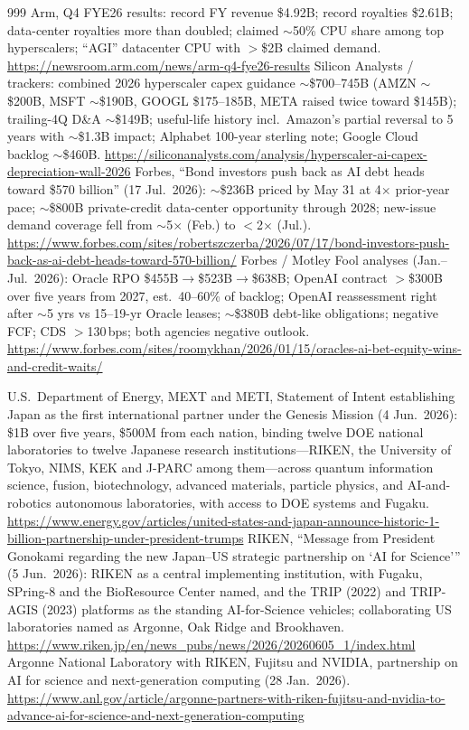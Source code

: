 \begin{thebibliography}{999}
 Arm, Q4 FYE26 results: record FY revenue \$4.92B; record royalties \$2.61B; data-center royalties more than doubled; claimed $\sim$50\% CPU share among top hyperscalers; ``AGI'' datacenter CPU with $>$\$2B claimed demand. \url{https://newsroom.arm.com/news/arm-q4-fye26-results}
 Silicon Analysts / trackers: combined 2026 hyperscaler capex guidance $\sim$\$700--745B (AMZN $\sim$\$200B, MSFT $\sim$\$190B, GOOGL \$175--185B, META raised twice toward \$145B); trailing-4Q D\&A $\sim$\$149B; useful-life history incl.\ Amazon's partial reversal to 5 years with $\sim$\$1.3B impact; Alphabet 100-year sterling note; Google Cloud backlog $\sim$\$460B. \url{https://siliconanalysts.com/analysis/hyperscaler-ai-capex-depreciation-wall-2026}
 Forbes, ``Bond investors push back as AI debt heads toward \$570 billion'' (17 Jul.\ 2026): $\sim$\$236B priced by May 31 at 4$\times$ prior-year pace; $\sim$\$800B private-credit data-center opportunity through 2028; new-issue demand coverage fell from $\sim$5$\times$ (Feb.) to $<$2$\times$ (Jul.). \url{https://www.forbes.com/sites/robertszczerba/2026/07/17/bond-investors-push-back-as-ai-debt-heads-toward-570-billion/}
 Forbes / Motley Fool analyses (Jan.--Jul.\ 2026): Oracle RPO \$455B$\to$\$523B$\to$\$638B; OpenAI contract $>$\$300B over five years from 2027, est.\ 40--60\% of backlog; OpenAI reassessment right after $\sim$5 yrs vs 15--19-yr Oracle leases; $\sim$\$380B debt-like obligations; negative FCF; CDS $>$130\,bps; both agencies negative outlook. \url{https://www.forbes.com/sites/roomykhan/2026/01/15/oracles-ai-bet-equity-wins-and-credit-waits/}

 U.S.\ Department of Energy, MEXT and METI, Statement of Intent establishing Japan as the first international partner under the Genesis Mission (4 Jun.\ 2026): \$1B over five years, \$500M from each nation, binding twelve DOE national laboratories to twelve Japanese research institutions---RIKEN, the University of Tokyo, NIMS, KEK and J-PARC among them---across quantum information science, fusion, biotechnology, advanced materials, particle physics, and AI-and-robotics autonomous laboratories, with access to DOE systems and Fugaku. \url{https://www.energy.gov/articles/united-states-and-japan-announce-historic-1-billion-partnership-under-president-trumps}
 RIKEN, ``Message from President Gonokami regarding the new Japan--US strategic partnership on `AI for Science''' (5 Jun.\ 2026): RIKEN as a central implementing institution, with Fugaku, SPring-8 and the BioResource Center named, and the TRIP (2022) and TRIP-AGIS (2023) platforms as the standing AI-for-Science vehicles; collaborating US laboratories named as Argonne, Oak Ridge and Brookhaven. \url{https://www.riken.jp/en/news_pubs/news/2026/20260605_1/index.html}
 Argonne National Laboratory with RIKEN, Fujitsu and NVIDIA, partnership on AI for science and next-generation computing (28 Jan.\ 2026). \url{https://www.anl.gov/article/argonne-partners-with-riken-fujitsu-and-nvidia-to-advance-ai-for-science-and-next-generation-computing}


\end{thebibliography}

